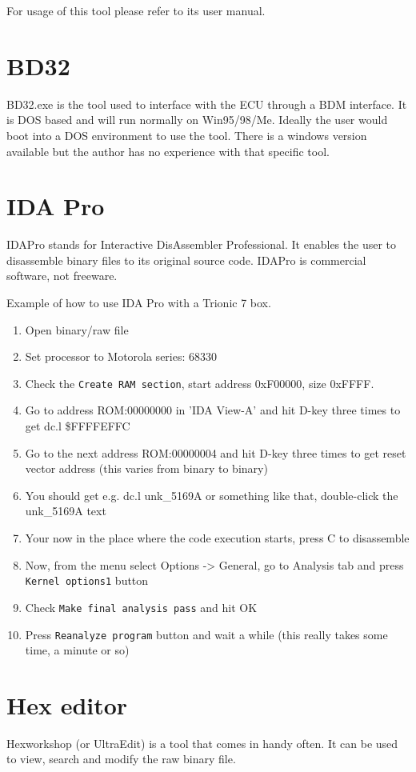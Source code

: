 \documentclass[11pt,a4paper]{book}
\begin{document}
For usage of this tool please refer to its user manual.

\section{BD32}
BD32.exe is the tool used to interface with the ECU through a BDM interface. It is DOS based and will
run normally on Win95/98/Me. Ideally the user would boot into a DOS environment to use the tool.
There is a windows version available but the author has no experience with that specific tool.

\section{IDA Pro}
IDAPro stands for Interactive DisAssembler Professional. It enables the user to disassemble binary
files to its original source code. IDAPro is commercial software, not freeware.

Example of how to use IDA Pro with a Trionic 7 box.
\begin{enumerate}
    \item Open binary/raw file
    \item Set processor to Motorola series: 68330
    \item Check the \texttt{Create RAM section}, start address 0xF00000, size 0xFFFF.
    \item Go to address ROM:00000000 in 'IDA View-A' and hit D-key three times
        to get dc.l \$FFFFEFFC
    \item Go to the next address ROM:00000004 and hit D-key three times to get reset vector address (this
varies from binary to binary)
\item You should get e.g. dc.l unk\_5169A or something like that, double-click
    the unk\_5169A text
\item Your now in the place where the code execution starts, press C to disassemble
\item Now, from the menu select Options -> General, go to Analysis tab and press
    \texttt{Kernel options1} button
\item Check \texttt{Make final analysis pass} and hit OK
\item Press \texttt{Reanalyze program} button and wait a while (this really takes some time, a minute or so)
\end{enumerate}

\section{Hex editor}
Hexworkshop (or UltraEdit) is a tool that comes in handy often. It can be used to view, search and
modify the raw binary file.
\end{document}
